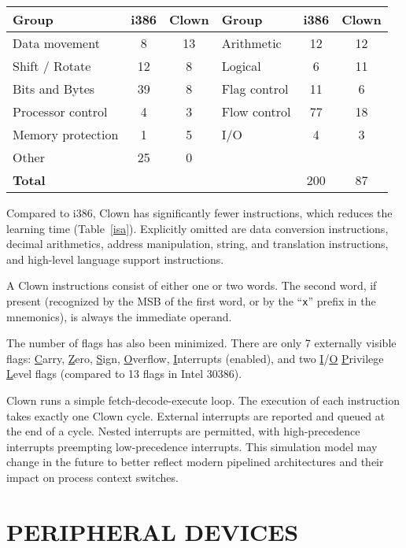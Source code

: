 \documentclass[10pt,twoside]{article}
\begin{document}
\begin{table*}[tb!]\centering
\caption{\label{isa}Comparison of the Clown and i386 instruction sets}
\baselineskip
\begin{tabular}{|l|c|c||l|c|c|}\hline
{\bf Group} & {\bf i386} & {\bf Clown} & {\bf Group} & {\bf i386} & {\bf Clown}\\\hline
Data movement & 8 & 13 & Arithmetic & 12 & 12\\
Shift / Rotate & 12 & 8 & Logical & 6 & 11\\
Bits and Bytes & 39 & 8 & Flag control &11&6\\
Processor control & 4 & 3&Flow control & 77 & 18\\
Memory protection & 1 & 5&I/O & 4 & 3\\
Other & 25 & 0&&&\\\hline
\multicolumn{4}{|l|}{\bf Total} & 200 & 87\\\hline
\end{tabular}
\end{table*}

Compared to i386, Clown has significantly fewer instructions, which
reduces the learning time (Table~\ref{isa}). Explicitly omitted are
data conversion instructions, decimal arithmetics, address
manipulation, string, and translation instructions, and high-level
language support instructions.

A Clown instructions consist of either one or two words. The second
word, if present (recognized by the MSB of the first word, or by the
``{\tt x}'' prefix in the mnemonics), is always the immediate operand.

The number of flags has also been minimized. There are only 7
externally visible flags: \underline{C}arry, \underline{Z}ero,
\underline{S}ign, \underline{O}verflow, \underline{I}nterrupts
(enabled), and two \underline{I}/\underline{O} \underline{P}rivilege
\underline{L}evel flags (compared to 13 flags in Intel 30386).

Clown runs a simple fetch-decode-execute loop. The execution of each
instruction takes exactly one Clown cycle. External interrupts are
reported and queued at the end of a cycle. Nested interrupts are
permitted, with high-precedence interrupts preempting low-precedence
interrupts. This simulation model may change in the future to better
reflect modern pipelined architectures and their impact on process
context switches.

\section{PERIPHERAL DEVICES}
\end{document}
